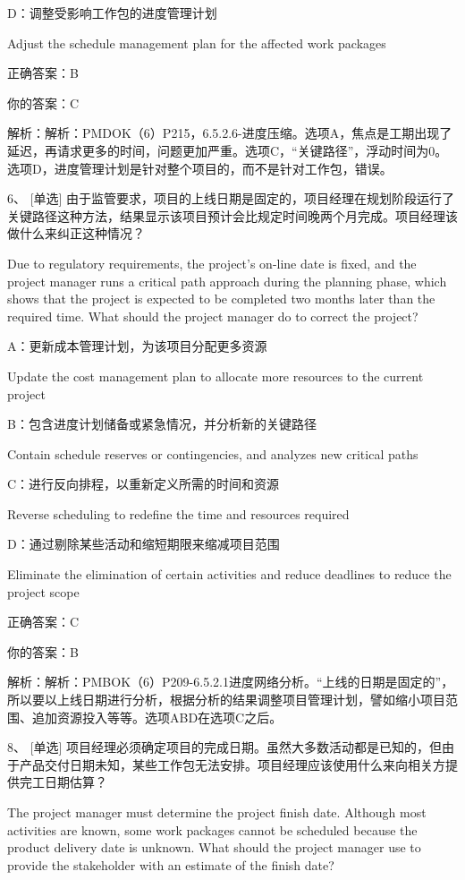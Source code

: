 D：调整受影响工作包的进度管理计划

Adjust the schedule management plan for the affected work packages

正确答案：B

你的答案：C

解析：解析：PMDOK（6）P215，6.5.2.6-进度压缩。选项A，焦点是工期出现了延迟，再请求更多的时间，问题更加严重。选项C，“关键路径”，浮动时间为0。选项D，进度管理计划是针对整个项目的，而不是针对工作包，错误。


6、 [单选] 由于监管要求，项目的上线日期是固定的，项目经理在规划阶段运行了关键路径这种方法，结果显示该项目预计会比规定时间晚两个月完成。项目经理该做什么来纠正这种情况？

Due to regulatory requirements, the project's on-line date is fixed, and the project manager runs a critical path approach during the planning phase, which shows that the project is expected to be completed two months later than the required time. What should the project manager do to correct the project?

A：更新成本管理计划，为该项目分配更多资源

Update the cost management plan to allocate more resources to the current project

B：包含进度计划储备或紧急情况，并分析新的关键路径

Contain schedule reserves or contingencies, and analyzes new critical paths

C：进行反向排程，以重新定义所需的时间和资源

Reverse scheduling to redefine the time and resources required

D：通过剔除某些活动和缩短期限来缩减项目范围

Eliminate the elimination of certain activities and reduce deadlines to reduce the project scope

正确答案：C

你的答案：B

解析：解析：PMBOK（6）P209-6.5.2.1进度网络分析。“上线的日期是固定的”，所以要以上线日期进行分析，根据分析的结果调整项目管理计划，譬如缩小项目范围、追加资源投入等等。选项ABD在选项C之后。



8、 [单选] 项目经理必须确定项目的完成日期。虽然大多数活动都是已知的，但由于产品交付日期未知，某些工作包无法安排。项目经理应该使用什么来向相关方提供完工日期估算？

The project manager must determine the project finish date. Although most activities are known, some work packages cannot be scheduled because the product delivery date is unknown. What should the project manager use to provide the stakeholder with an estimate of the finish date?

